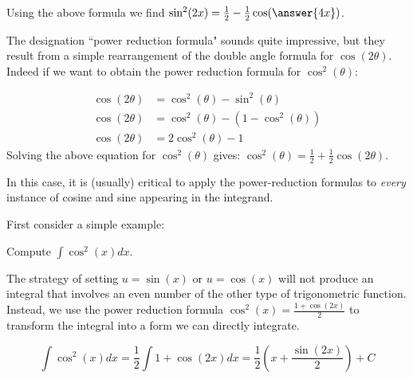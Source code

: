 \documentclass{ximera}
\begin{document}
\begin{question}
Using the above formula we find $\sin^2(2x) = \frac{1}{2}-\frac{1}{2} \cos(\answer{4x})$.
\end{question}

\begin{remark}
The designation ``power reduction formula" sounds quite impressive, but they result from a simple rearrangement of the double angle formula for $\cos(2\theta)$.  Indeed if we want to obtain the power reduction formula for $\cos^2(\theta)$:

\begin{align*}
\cos(2\theta) &= \cos^2(\theta)-\sin^2(\theta) \\
\cos(2\theta) &= \cos^2(\theta) - (1-\cos^2(\theta)) \\
\cos(2\theta) &= 2\cos^2(\theta)-1
\end{align*}
Solving the above equation for $\cos^2(\theta)$ gives: $\cos^2(\theta) = \frac{1}{2} +\frac{1}{2} \cos(2\theta)$.
\end{remark}

In this case, it is (usually) critical to apply the power-reduction
formulas to \textit{every} instance of cosine and sine appearing in
the integrand.

First consider a simple example:

\begin{example}
Compute $\int \cos^{2}(x) dx$.

\begin{explanation}
The strategy of setting $u=\sin(x)$ or $u=\cos(x)$ will not produce an integral that involves an even number of the other type of trigonometric function.  Instead, we use the power reduction formula $\cos^{2}(x)=\frac{1+\cos(2x)}{2}$ to transform the integral into a form we can directly integrate.

\[
\int \cos^{2} (x) dx= \frac{1}{2} \int 1+\cos(2x) dx = \frac{1}{2} \left( x+ \frac{ \sin(2x)}{2} \right) + C
\]


\end{explanation}
\end{example}
\end{document}
